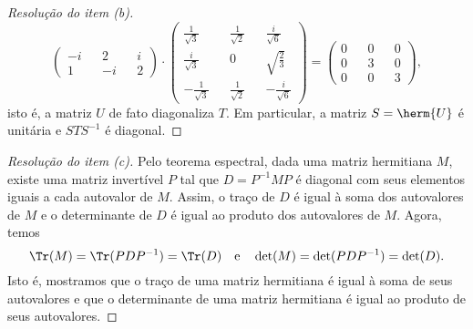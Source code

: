 \begin{proof}[Resolução do item (b)]
\begin{equation*}
\begin{pmatrix}
            -i&& 2 && i\\
            1 &&-i && 2
        \end{pmatrix}
        \cdot
        \begin{pmatrix}
            \frac{1}{\sqrt{3}} && \frac{1}{\sqrt{2}} && \frac{i}{\sqrt{6}}\\
            \frac{i}{\sqrt{3}} && 0 && \sqrt{\frac23}\\
            -\frac{1}{\sqrt{3}}&& \frac{1}{\sqrt{2}} && -\frac{i}{\sqrt{6}}
        \end{pmatrix}
        =
        \begin{pmatrix}
            0 && 0 && 0\\
            0 && 3 && 0\\
            0 && 0 && 3
        \end{pmatrix},
    \end{equation*}
    isto é, a matriz \(U\) de fato diagonaliza \(T\). Em particular, a matriz \(S = \herm{U}\) é unitária e \(STS^{-1}\) é diagonal.
\end{proof}
\begin{proof}[Resolução do item (c)]
    Pelo teorema espectral, dada uma matriz hermitiana \(M\), existe uma matriz invertível \(P\) tal que \(D = P^{-1}MP\) é diagonal com seus elementos iguais a cada autovalor de \(M\). Assim, o traço de \(D\) é igual à soma dos autovalores de \(M\) e o determinante de \(D\) é igual ao produto dos autovalores de \(M\). Agora, temos
    \begin{equation*}
        \Tr(M) = \Tr(PDP^{-1}) = \Tr(D)\quad\text{e}\quad\det(M) = \det(PDP^{-1}) = \det(D).
    \end{equation*}
    Isto é, mostramos que o traço de uma matriz hermitiana é igual à soma de seus autovalores e que o determinante de uma matriz hermitiana é igual ao produto de seus autovalores.
\end{proof}
